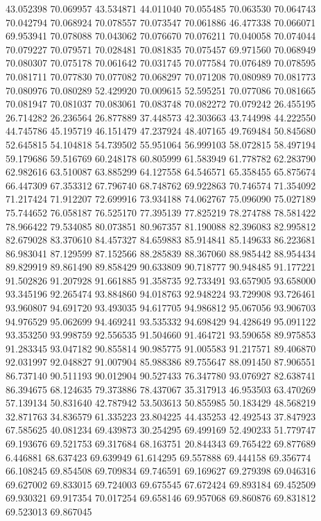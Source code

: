 43.052398
70.069957
43.534871
44.011040
70.055485
70.063530
70.064743
70.042794
70.068924
70.078557
70.073547
70.061886
46.477338
70.066071
69.953941
70.078088
70.043062
70.076670
70.076211
70.040058
70.074044
70.079227
70.079571
70.028481
70.081835
70.075457
69.971560
70.068949
70.080307
70.075178
70.061642
70.031745
70.077584
70.076489
70.078595
70.081711
70.077830
70.077082
70.068297
70.071208
70.080989
70.081773
70.080976
70.080289
52.429920
70.009615
52.595251
70.077086
70.081665
70.081947
70.081037
70.083061
70.083748
70.082272
70.079242
26.455195
26.714282
26.236564
26.877889
37.448573
42.303663
43.744998
44.222550
44.745786
45.195719
46.151479
47.237924
48.407165
49.769484
50.845680
52.645815
54.104818
54.739502
55.951064
56.999103
58.072815
58.497194
59.179686
59.516769
60.248178
60.805999
61.583949
61.778782
62.283790
62.982616
63.510087
63.885299
64.127558
64.546571
65.358455
65.875674
66.447309
67.353312
67.796740
68.748762
69.922863
70.746574
71.354092
71.217424
71.912207
72.699916
73.934188
74.062767
75.096090
75.027189
75.744652
76.058187
76.525170
77.395139
77.825219
78.274788
78.581422
78.966422
79.534085
80.073851
80.967357
81.190088
82.396083
82.995812
82.679028
83.370610
84.457327
84.659883
85.914841
85.149633
86.223681
86.983041
87.129599
87.152566
88.285839
88.367060
88.985442
88.954434
89.829919
89.861490
89.858429
90.633809
90.718777
90.948485
91.177221
91.502826
91.207928
91.661885
91.358735
92.733491
93.657905
93.658000
93.345196
92.265474
93.884860
94.018763
92.948224
93.729908
93.726461
93.960807
94.691720
93.493035
94.617705
94.986812
95.067056
93.906703
94.976529
95.062699
94.469241
93.535332
94.698429
94.428649
95.091122
93.353250
93.998759
92.556535
91.504660
91.464721
93.590658
89.975853
91.283345
93.047182
90.855814
90.985775
91.005583
91.217571
89.406870
92.031997
92.048827
91.007904
85.988386
89.755647
88.091450
87.906551
86.737140
90.511193
90.012904
90.527433
76.347780
93.076927
82.638741
86.394675
68.124635
79.373886
78.437067
35.317913
46.953503
63.470269
57.139134
50.831640
42.787942
53.503613
50.855985
50.183429
48.568219
32.871763
34.836579
61.335223
23.804225
44.435253
42.492543
37.847923
67.585625
40.081234
69.439873
30.254295
69.499169
52.490233
51.779747
69.193676
69.521753
69.317684
68.163751
20.844343
69.765422
69.877689
6.446881
68.637423
69.639949
61.614295
69.557888
69.444158
69.356774
66.108245
69.854508
69.709834
69.746591
69.169627
69.279398
69.046316
69.627002
69.833015
69.724003
69.675545
67.672424
69.893184
69.452509
69.930321
69.917354
70.017254
69.658146
69.957068
69.860876
69.831812
69.523013
69.867045
